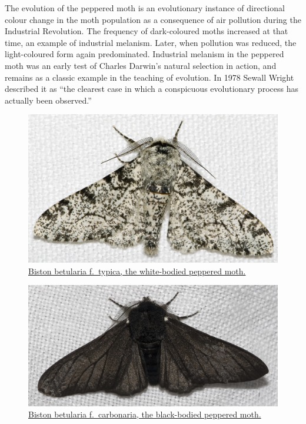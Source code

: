 The evolution of the peppered moth is an evolutionary instance of directional colour change in the moth population as a consequence of air pollution during the Industrial Revolution. The frequency of dark-coloured moths increased at that time, an example of industrial melanism. Later, when pollution was reduced, the light-coloured form again predominated. Industrial melanism in the peppered moth was an early test of Charles Darwin's natural selection in action, and remains as a classic example in the teaching of evolution. In 1978 Sewall Wright described it as ``the clearest case in which a conspicuous evolutionary process has actually been observed.''



\begin{figure}

{\centering \includegraphics[width=0.7\linewidth]{./figures/evolution/Biston.betularia.7200} 

}

\caption{\href{https://commons.wikimedia.org/wiki/File:Biston.betularia.7200.jpg}{Biston betularia f.~typica, the white-bodied peppered moth.}}\label{fig:whitepeppered}
\end{figure}



\begin{figure}

{\centering \includegraphics[width=0.7\linewidth]{./figures/evolution/Biston.betularia.f.carbonaria.7209} 

}

\caption{\href{https://commons.wikimedia.org/wiki/File:Biston.betularia.f.carbonaria.7209.jpg}{Biston betularia f.~carbonaria, the black-bodied peppered moth.}}\label{fig:carbonaramoth}
\end{figure}

